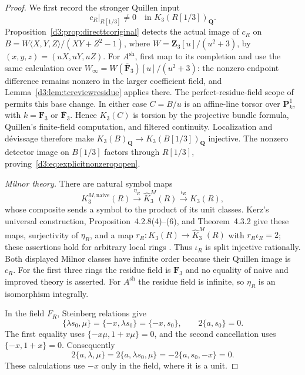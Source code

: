 \documentclass[11pt,a4paper]{amsart}
\numberwithin{equation}{section}
\theoremstyle{definition}
\theoremstyle{remark}
\begin{document}
\begin{proof}
We first record the stronger Quillen input
\begin{equation}\label{d3:eq:explicitnonzeropopen}
 c_R|_{R[1/3]}\ne0\quad\text{in }K_3(R[1/3])_{\mathbf Q}.
\end{equation}
Proposition~\ref{d3:prop:directtcoriginal} detects the actual image of
$c_R$ on
$B=W\langle X,Y,Z\rangle/(XY+Z^2-1)$, where
$W=\mathbf Z_3[u]/(u^2+3)$, by $(x,y,z)=(uX,uY,uZ)$.
For $A^{\mathrm{sh}}$, first map to its completion and use the same
calculation over
$W_\infty=W(\overline{\mathbf F}_3)[u]/(u^2+3)$:
the nonzero endpoint difference remains nonzero in the larger
coefficient field, and Lemma~\ref{d3:lem:tcreviewresidue} applies there.
The perfect-residue-field scope of
\cite[Proposition~4.10]{AMMN} permits this base change.
In either case $C=B/u$ is an affine-line torsor over
$\mathbf P^1_k$, with $k=\mathbf F_3$ or
$\overline{\mathbf F}_3$. Hence $K_3(C)$ is torsion by the projective
bundle formula, Quillen's finite-field computation, and filtered
continuity. Localization and d\'evissage therefore make
$K_3(B)_{\mathbf Q}\to K_3(B[1/3])_{\mathbf Q}$ injective.
The nonzero detector image on $B[1/3]$ factors through $R[1/3]$,
proving~\eqref{d3:eq:explicitnonzeropopen}.

\emph{Milnor theory.}
There are natural symbol maps
\[
 K_3^{M,\mathrm{naive}}(R)
 \xrightarrow{\eta_R}\widehat K_3^M(R)
 \xrightarrow{\iota_R}K_3(R),
\]
whose composite sends a symbol to the product of its unit classes.
Kerz's universal construction, Proposition~4.2.8(4)--(6), and
Theorem~4.3.2 give these maps, surjectivity of $\eta_R$, and a map
$r_R:K_3(R)\to\widehat K_3^M(R)$ with
$r_R\iota_R=2$; these assertions hold for arbitrary local rings
\cite[Theorem~4.2.5, Proposition~4.2.8, Theorem~4.3.2]{KerzThesis}.
Thus $\iota_R$ is split injective rationally. Both displayed Milnor
classes have infinite order because their Quillen image is $c_R$.
For the first three rings the residue field is $\mathbf F_3$ and no
equality of naive and improved theory is asserted. For
$A^{\mathrm{sh}}$ the residue field is infinite, so $\eta_R$ is an
isomorphism integrally.

In the field $F_R$, Steinberg relations give
\[
 \{\lambda s_0,\mu\}
 =\{-x,\lambda s_0\}=\{-x,s_0\},
 \qquad 2\{a,s_0\}=0.
\]
The first equality uses $\{-x\mu,1+x\mu\}=0$, and the second
cancellation uses $\{-x,1+x\}=0$. Consequently
\[
 2\{a,\lambda,\mu\}
 =2\{a,\lambda s_0,\mu\}
 =-2\{a,s_0,-x\}=0.
\]
These calculations use $-x$ only in the field, where it is a unit.


\end{proof}
\end{document}
